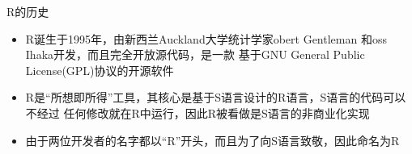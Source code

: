 \documentclass{beamerthemeMono}
\begin{document}
\begin{frame}[t]{\subsecname}{R的历史}

\begin{itemize}
 \item R诞生于1995年，由新西兰Auckland大学统计学家obert Gentleman
        和oss Ihaka开发，而且完全开放源代码，是一款
        基于GNU General Public License(GPL)协议的开源软件
 \item R是“所想即所得”工具，其核心是基于S语言设计的R语言，S语言的代码可以不经过
        任何修改就在R中运行，因此R被看做是S语言的非商业化实现
 \item 由于两位开发者的名字都以“R”开头，而且为了向S语言致敬，因此命名为R 
\end{itemize}

\begin{overlayarea} {\textwidth}{\textheight}
    \begin{figure}\centering
      \captionsetup[subfigure]{labelformat=empty} 
       \vspace{1pt}
    \end{figure}
\end{overlayarea}

\end{frame}
\end{document}

